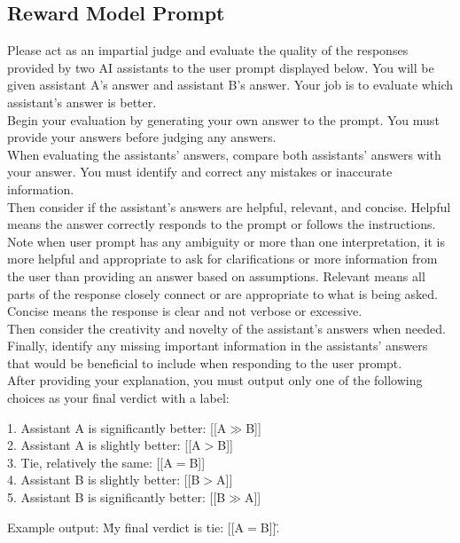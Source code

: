  \subsection{Reward Model Prompt}
\label{section:reward}
\begin{tcolorbox}[colback=gray!10,colframe=black!50,arc=4mm]
Please act as an impartial judge and evaluate the quality of the responses provided by two AI assistants to the user prompt displayed below. You will be given assistant A's answer and assistant B's answer. Your job is to evaluate which assistant's answer is better.\\Begin your evaluation by generating your own answer to the prompt. You must provide your answers before judging any answers.\\When evaluating the assistants' answers, compare both assistants' answers with your answer. You must identify and correct any mistakes or inaccurate information.\\Then consider if the assistant's answers are helpful, relevant, and concise. Helpful means the answer correctly responds to the prompt or follows the instructions. Note when user prompt has any ambiguity or more than one interpretation, it is more helpful and appropriate to ask for clarifications or more information from the user than providing an answer based on assumptions. Relevant means all parts of the response closely connect or are appropriate to what is being asked. Concise means the response is clear and not verbose or excessive.\\Then consider the creativity and novelty of the assistant's answers when needed. Finally, identify any missing important information in the assistants' answers that would be beneficial to include when responding to the user prompt.\\After providing your explanation, you must output only one of the following choices as your final verdict with a label:

1. Assistant A is significantly better: [[A$\gg$B]]\\
2. Assistant A is slightly better: [[A$>$B]]\\
3. Tie, relatively the same: [[A$=$B]]\\
4. Assistant B is slightly better: [[B$>$A]]\\
5. Assistant B is significantly better: [[B$\gg$A]]

Example output: \"My final verdict is tie: [[A$=$B]]\".
\end{tcolorbox}



